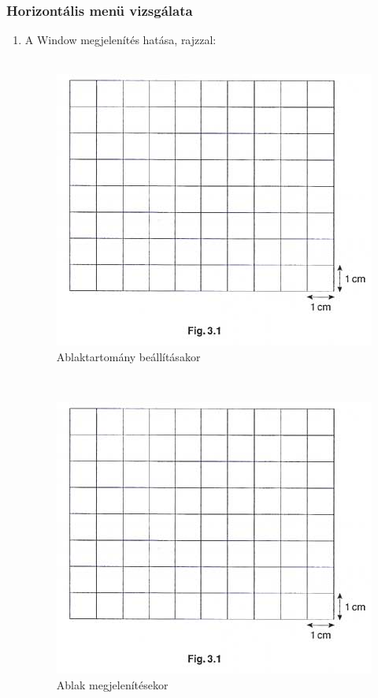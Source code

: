 \documentclass[10pt,a4paper]{article}
\begin{document}
		\subsubsection{Horizontális menü vizsgálata}\newpage
		\begin{enumerate}
			\item A Window megjelenítés hatása, rajzzal:
			\\\\
						\begin{figure}[hbtp]
						\centering
				    		 \includegraphics[scale=0.5]{teljes/osc.jpg}
						\caption{Ablaktartomány beállításakor}
						\end{figure}
			\\
					\begin{figure}[hbtp]
					\centering
					\includegraphics[scale=0.5]{teljes/osc.jpg}
					\caption{Ablak megjelenítésekor}

\end{figure}
\end{enumerate}
\end{document}
